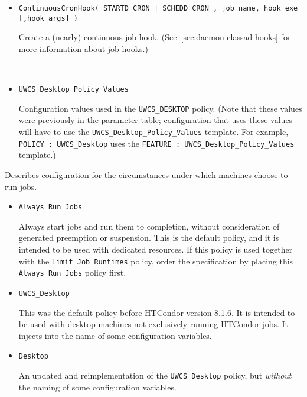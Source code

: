 \begin{description}
\begin{itemize}
    \item \texttt{ContinuousCronHook( STARTD\_CRON | SCHEDD\_CRON ,
	job\_name, hook\_exe [,hook\_args] )}

	Create a (nearly) continuous job hook.
	(See~\ref{sec:daemon-classad-hooks} for more information about job hooks.)

\
    \item \texttt{UWCS\_Desktop\_Policy\_Values}

	Configuration values used in the \texttt{UWCS\_DESKTOP} policy.
	(Note that these values were previously in the parameter table;
	configuration that uses these values will have to use the
	\texttt{UWCS\_Desktop\_Policy\_Values} template.  For example,
	\texttt{POLICY : UWCS\_Desktop} uses the
	\texttt{FEATURE : UWCS\_Desktop\_Policy\_Values} template.)
  \end{itemize}

\label{usecategory:POLICY}
\item[\MacroNI{POLICY category}]
  Describes configuration for the circumstances under which
  machines choose to run jobs.
  \begin{itemize}

    \item \texttt{Always\_Run\_Jobs}

    Always start jobs and run them to completion, without consideration of
    \Condor{negotiator} generated preemption or suspension.
    This is the default policy, and it is intended to be used with dedicated
    resources.
    If this policy is used together with the \texttt{Limit\_Job\_Runtimes}
    policy,
    order the specification by placing this \texttt{Always\_Run\_Jobs} 
    policy first. 

    \item \texttt{UWCS\_Desktop}

    This was the default policy before HTCondor version 8.1.6.
    It is intended to be used with desktop machines not exclusively running
    HTCondor jobs.
    It injects  into the name of some configuration variables.

    \item \texttt{Desktop}

    An updated and reimplementation of the \texttt{UWCS\_Desktop} policy,
    but \emph{without} the \Expr{UWCS} naming of some configuration variables.


\end{itemize}
\end{description}
